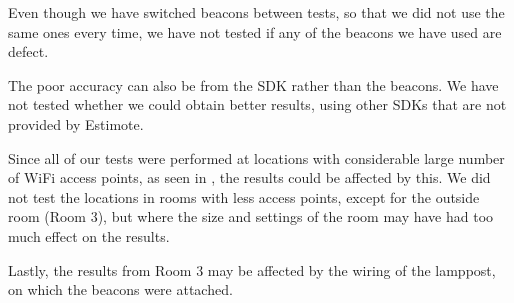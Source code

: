 Even though we have switched beacons between tests, 
so that we did not use the same ones every time, 
we have not tested if any of the beacons we have used are defect. 

The poor accuracy can also be from the SDK rather than the beacons. 
We have not tested whether we could obtain better results, 
using other SDKs that are not provided by Estimote. 

Since all of our tests were performed at locations with considerable large number of WiFi access points, as seen in ,
the results could be affected by this. 
We did not test the locations in rooms with less access points, 
except for the outside room (Room 3), 
but where the size and settings of the room may have had too much effect on the results.

Lastly, the results from Room 3 may be affected by the wiring of the lamppost, 
on which the beacons were attached.
